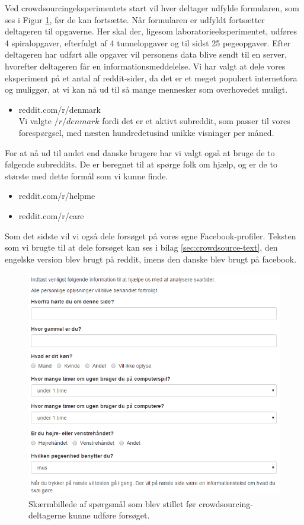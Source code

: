 Ved crowdsourcingeksperimentets start vil hver deltager udfylde formularen, som ses i Figur \ref{fig:Questions}, før de kan fortsætte. Når formularen er udfyldt fortsætter deltageren til opgaverne. Her skal der, ligesom laboratorieeksperimentet, udføres 4 spiralopgaver, efterfulgt af 4 tunnelopgaver og til sidst 25 pegeopgaver. Efter deltageren har udført alle opgaver vil personens data blive sendt til en server, hvorefter deltageren får en informationsmeddelelse.
Vi har valgt at dele vores eksperiment på et antal af reddit-sider, da det er et meget populært internetfora og muliggør, at vi kan nå ud til så mange mennesker som overhovedet muligt.
\begin{itemize}
\item reddit.com/r/denmark\\
Vi valgte $/r/denmark$ fordi det er et aktivt subreddit, som passer til vores forespørgsel, med næsten hundredetusind unikke visninger per måned.
\end{itemize}
For at nå ud til andet end danske brugere har vi valgt også at bruge de to følgende subreddits. De er beregnet til at spørge folk om hjælp, og er de to største med dette formål som vi kunne finde.
\begin{itemize}
\item reddit.com/r/helpme
\item reddit.com/r/care
\end{itemize}

Som det sidste vil vi også dele forsøget på vores egne Facebook-profiler. Teksten som vi brugte til at dele forsøget kan ses i bilag \ref{sec:crowdsource-text}, den engelske version blev brugt på reddit, imens den danske blev brugt på facebook.
\begin{figure}[h]
\centering
\includegraphics[width=.5\linewidth, trim = 0cm 0cm 7cm 0cm, clip]{images/screenshots/ex_questions}
\caption{Skærmbillede af spørgsmål som blev stillet før crowdsourcing-deltagerne kunne udføre forsøget.}
\label{fig:Questions}
\end{figure}

